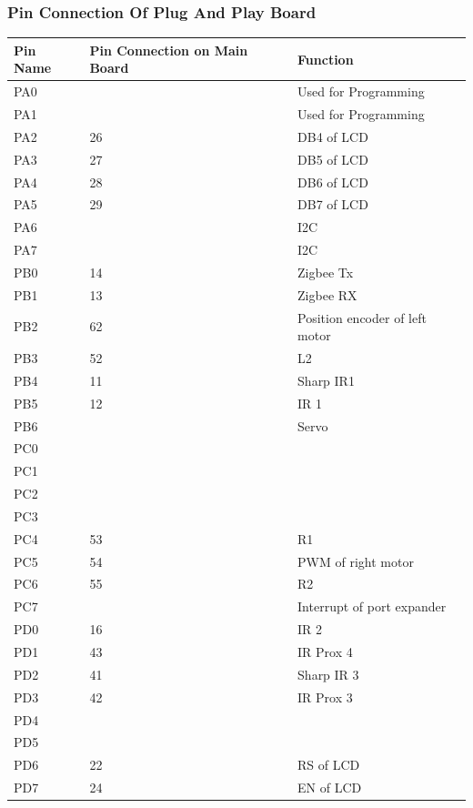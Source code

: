 \documentclass[a4paper,10pt,oneside]{article}
\begin{document}
{\begin{longtable}{|p{}|p{}|p{}|p{}|p{}|}
		\end{longtable}
	\subsubsection{Pin Connection Of Plug And Play Board}
		\begin{longtable}{|p{}|p{}|p{}|}\hline
			Pin Name&	Pin Connection on Main Board&	Function \\ \hline
			PA0&&	Used for Programming\\ \hline
			PA1&&	Used for Programming\\ \hline
			PA2&	26&	DB4 of LCD\\ \hline
			PA3&	27&	DB5 of LCD\\ \hline
			PA4&	28&	DB6 of LCD\\ \hline
			PA5&	29&	DB7 of LCD\\ \hline
			PA6&	&I2C\\ \hline
			PA7&	&I2C\\ \hline
			
			PB0&	14&	Zigbee Tx\\ \hline
			PB1&	13&	Zigbee RX\\ \hline
			PB2&	62&	Position encoder of left motor\\ \hline
			PB3&	52&	L2\\ \hline
			PB4&	11&	Sharp IR1\\ \hline
			PB5&	12&	IR 1\\ \hline
			PB6&	&	Servo\\ \hline
			PC0	&	&\\ \hline
			PC1&	&	\\ \hline
			PC2&	&	\\ \hline
			PC3&	&	\\ \hline
			PC4&	53&	R1\\ \hline
			PC5&	54&	PWM of right motor\\ \hline
			PC6&	55&	R2\\ \hline
			PC7&	&	Interrupt of port expander\\ \hline
			
			PD0	&16	&IR 2\\ \hline
			PD1&	43&	IR Prox 4\\ \hline
			PD2&	41&	Sharp IR 3\\ \hline
			PD3&	42&	IR Prox 3\\ \hline
			PD4&	&	\\ \hline
			PD5&	&	\\ \hline
			PD6&	22&	RS of LCD\\ \hline
			PD7&	24&	EN of LCD\\ \hline
			

\end{longtable}}
\end{document}

